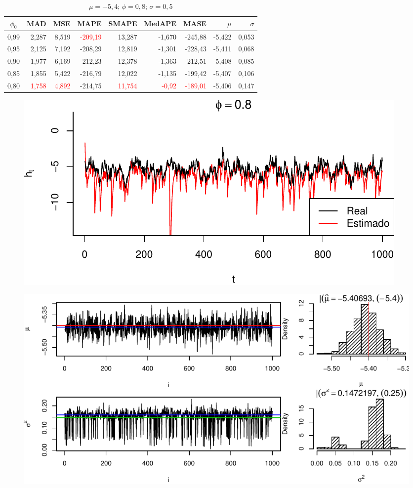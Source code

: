 \documentclass[12pt, a4paper]{article}
\begin{document}
\newpage
\begin{table}[ht]
  \centering
  \caption{$\mu =-5,4$; $\phi = 0,8$; $\sigma = 0,5$}
  \begin{tabular}{c|rrrrrr|rr}
    \hline
    $\phi_0$ & MAD & MSE & MAPE & SMAPE & MedAPE & MASE & $\bar{\mu}$ & $\bar{\sigma}$\\
    \hline
    0,99 & 2,287 & 8,519 & \textcolor{red}{-209,19} & 13,287 & -1,670 & -245,88 & -5,422 & 0,053\\
    0,95 & 2,125 & 7,192 & -208,29 & 12,819 & -1,301 & -228,43 & -5,411 & 0,068\\
    0,90 & 1,977 & 6,169 & -212,23 & 12,378 & -1,363 & -212,51 & -5,408 & 0,085\\
    0,85 & 1,855 & 5,422 & -216,79 & 12,022 & -1,135 & -199,42 & -5,407 & 0,106\\
    0,80 & \textcolor{red}{1,758} & \textcolor{red}{4,892} & -214,75 & \textcolor{red}{11,754} & \textcolor{red}{-0,92} & \textcolor{red}{-189,01} & -5,406 & 0,147\\
    \hline
  \end{tabular}  
\end{table}

\begin{figure}[ht]
  \centering
  \includegraphics{img/p08s05_final}
\end{figure}

\begin{figure}[H]
  \centering
  \includegraphics{img/p08s05_resultado}
\end{figure}
\end{document}
